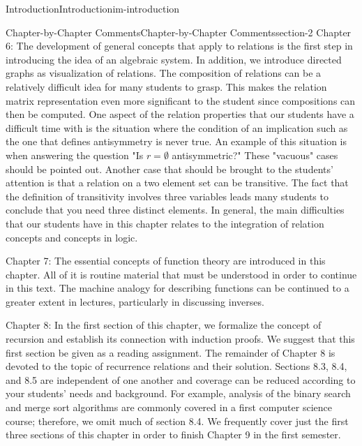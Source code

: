 \documentclass[oneside,10pt,]{book}
\begin{document}
\begin{chapterptx}{Introduction}{}{Introduction}{}{}{im-introduction}
\begin{sectionptx}{Chapter-by-Chapter Comments}{}{Chapter-by-Chapter Comments}{}{}{section-2}
Chapter 6: The development of general concepts that apply to relations is the first step in introducing the idea of an algebraic system. In addition, we introduce directed graphs as visualization of relations. The composition of relations can be a relatively difficult idea for many students to grasp.  This makes the relation matrix representation even more significant to the student since compositions can then be computed. One aspect of the relation properties that our students have a difficult time with is the situation where the condition of an implication such as the one that defines antisymmetry is never true. An example of this situation is when answering the question "Is \(r =\emptyset\) antisymmetric?"  These "vacuous" cases should be pointed out. Another case that should be brought to the students' attention is that a relation on a two element set can be transitive. The fact that the definition of transitivity involves three variables leads many students to conclude that you need three distinct elements. In general, the main difficulties that our students have in this chapter relates to the integration of relation concepts and concepts in logic.%
\par
\hypertarget{p-15}{}%
Chapter 7: The essential concepts of function theory are introduced in this chapter. All of it is routine material that must be understood in order to continue in this text. The machine analogy for describing functions can be continued to a greater extent in lectures, particularly in discussing inverses.%
\par
\hypertarget{p-16}{}%
Chapter 8: In the first section of this chapter, we formalize the concept of recursion and establish its connection with induction proofs. We suggest that this first section be given as a reading assignment. The remainder of Chapter 8 is devoted to the topic of recurrence relations and their solution. Sections 8.3, 8.4, and 8.5 are independent of one another and coverage can be reduced according to your students' needs and background. For example, analysis of the binary search and merge sort algorithms  are commonly covered in a first computer science course; therefore, we omit much of section 8.4. We frequently cover just the first three sections of this chapter in order to finish Chapter 9 in the first semester.%
\par
\hypertarget{p-17}{}%

\end{sectionptx}
\end{chapterptx}
\end{document}
